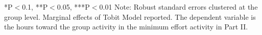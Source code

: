 \begin{table}[htbp]
\begin{tabular}{c c c c c}
\end{tabular}

\begin{footnotesize}
\newline
*P$<$0.1, **P$<$0.05, ***P$<$0.01
\newline
Note: Robust standard errors clustered at the group level. Marginal effects of Tobit Model reported. 
\newline
The dependent variable is the hours toward the group activity in the minimum effort activity in Part II.\end{footnotesize}
\end{table}